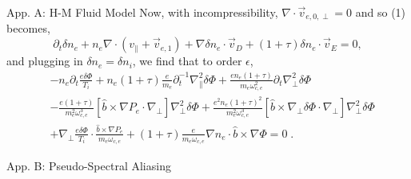 \documentclass[aspectratio=43]{beamer}
\begin{document}
   \begin{frame}{App. A: H-M Fluid Model}
      \quad Now, with incompressibility, $\nabla\cdot\vec{v}_{e,0,\perp}=0$ and so (1) becomes,
      \begin{equation}
         \partial_t\delta n_e+n_e\nabla\cdot(v_{\parallel} + \vec{v}_{e,1}) + \nabla\delta n_e\cdot\vec{v}_D+(1+\tau)\delta n_e\cdot\vec{v}_E = 0,
      \end{equation}
      and plugging in $\delta n_e=\delta n_i$, we find that to order $\epsilon$,
      \begin{equation}
      \begin{aligned}
         &-n_e\partial_t\frac{e\delta\Phi}{T_i} + n_e(1+\tau)\frac{e}{m_e}\partial_t^{-1}\nabla_{\parallel}^2\delta\Phi
         + \frac{en_e(1+\tau)}{m_e\omega_{c,e}^2}\partial_t\nabla_{\perp}^2\delta\Phi \\
         &- \frac{e(1+\tau)}{m_e^2\omega_{c,e}^3}[\hat{b}\times\nabla P_e\cdot\nabla_{\perp}]\nabla_{\perp}^2\delta\Phi
         + \frac{e^2n_e(1+\tau)^2}{m_e^2\omega_{c,e}^3}[\hat{b}\times\nabla_{\perp}\delta\Phi\cdot\nabla_{\perp}]\nabla_{\perp}^2\delta\Phi \\
         &+ \nabla_{\perp}\frac{e\delta\Phi}{T_i}\cdot\frac{\hat{b}\times\nabla P_e}{m_e\omega_{c,e}} + (1+\tau)\frac{e}{m_e\omega_{c,e}}\nabla n_e\cdot\hat{b}\times\nabla\Phi = 0\;.
      \end{aligned}
      \end{equation}
   \end{frame}

   \begin{frame}{App. B: Pseudo-Spectral Aliasing}
   \end{frame}
\end{document}
